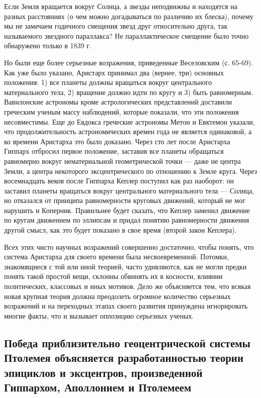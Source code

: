 Если Земля вращается вокруг Солнца, а звезды неподвижны и находятся на
разных расстояниях (о чем можно догадываться по различию их блеска),
почему мы не замечаем годичного смещения звезд друг относительно
друга, так называемого звездного параллакса? Не параллактическое
смещение было точно обнаружено только в 1839 г.

Но были еще более серьезные возражения, приведенные Веселовским (с.
65-69). Как уже было указано, Аристарх принимал два (вернее, три)
основных положения: 1) все планеты должны вращаться вокруг
центрального материального тела, 2) вращение должно идти по кругу и 3)
быть равномерным. Вавилонские астрономы кроме астрологических
представлений доставили греческим ученым массу наблюдений, которые
показали, что эти положения несовместимы. Еще до Евдокса греческие
астрономы Метон и Евктемон указали, что продолжительность
астрономических времен года не является одинаковой, а ко времени
Аристарха это было доказано. Через сто лет после Аристарха Гиппарх
отбросил первое положение, заставив все планеты обращаться равномерно
вокруг нематериальной геометрической точки --- даже не центра Земли, а
центра некоторого эксцентрического по отношению к Земле круга. Через
восемнадцать веков после Гиппарха Кеплер поступил как раз наоборот: он
заставил планеты вращаться вокруг центрального материального тела ---
Солнца, но отказался от принципа равномерности круговых движений,
который не мог нарушить и Коперник. Правильнее будет сказать, что
Кеплер заменил движение по кругам движением по эллипсам и придал
понятию равномерности движения другой смысл, как это будет показано в
свое время (второй закон Кеплера).

Всех этих чисто научных возражений совершенно достаточно, чтобы
понять, что система Аристарха для своего времени была несвоевременной.
Потомки, знакомящиеся с той или иной теорией, часто удивляются, как не
могли предки понять такой простой вещи, склонны обвинять их в
косности, влиянии политических, классовых и иных мотивов. Дело же
объясняется тем, что всякая новая крупная теория должна преодолеть
огромное количество серьезных возражений и на переходных этапах своего
развития принуждена игнорировать многие факты, что и вызывает
оппозицию серьезных ученых.

\subsection{Победа приблизительно геоцентрической системы Птолемея
объясняется разработанностью теории эпициклов и эксцентров,
произведенной Гиппархом, Аполлонием и Птолемеем}

